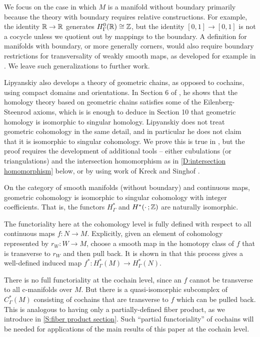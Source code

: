 We focus on the case in which $M$ is a manifold without boundary primarily because
the theory with boundary requires relative constructions.
For example, the identity $\mathbb{R}\to\mathbb{R}$ generates $H_\Gamma^0(\mathbb{R})\cong \mathbb{Z}$, but the identity $[0,1] \to [0,1]$ is not a cocycle unless we quotient out by mappings to the boundary.
A definition for manifolds with boundary, or more generally corners, would also require boundary restrictions for transversality of weakly smooth maps, as developed for example in \cite{Joy12}.
We leave such generalizations to further work.

Lipyanskiy also develops a theory of geometric chains, as opposed to cochains, using compact domains and orientations.
In Section 6 of \cite{Lipy14}, he shows that the homology theory based on geometric chains satisfies some of the Eilenberg-Steenrod axioms, which is is enough to deduce in Section 10 that geometric homology is isomorphic to singular homology.
Lipyanskiy does not treat geometric cohomology in the same detail, and in particular he does not claim that it is isomorphic to singular cohomology.
We prove this is true in \cite{medina2022foundations}, but the proof requires the development of additional tools -- either cubulations (or triangulations) and the
intersection homomorphism as in \cref{D:intersection homomorphism} below, or by using work of Kreck and Singhof \cite{Krec10, Krec10b}.

\begin{theorem}\label{T:geometric singular isomorphism}
	On the category of smooth manifolds (without boundary) and continuous maps, geometric cohomology is isomorphic to singular cohomology with integer coefficients.
	That is, the functors $H^*_\Gamma$ and $H^*(\cdot \,;\mathbb{Z})$ are naturally isomorphic.
\end{theorem}

The functoriality here at the cohomology level is fully defined with respect to all continuous maps $f \colon N \to M$.
Explicitly, given an element of cohomology represented by $r_W \colon W \to M$, choose a smooth map in the homotopy class of $f$ that is transverse to $r_W$ and then pull back.
It is shown in \cite{medina2022foundations} that this process gives a well-defined induced map $f^* \colon H^*_\Gamma(M) \to H^*_\Gamma(N)$.

There is no full functoriality at the cochain level, since an $f$ cannot be transverse to all c-manifolds over $M$.
But there is a quasi-isomorphic subcomplex of $C_\Gamma^*(M)$ consisting of cochains that are transverse to $f$ which can be pulled back.
This is analogous to having only a partially-defined fiber product, as we introduce in \cref{S:fiber product section}.
Such ``partial functoriality'' of cochains will be needed for applications of the main results of this paper at the cochain level.


